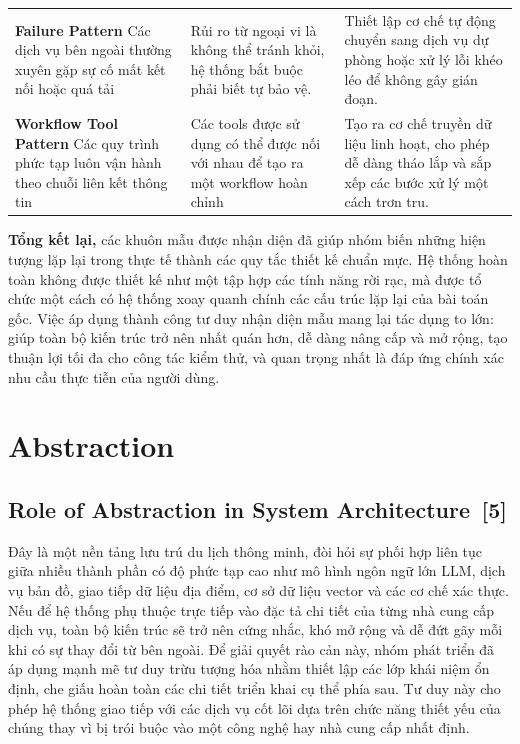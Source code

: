 \documentclass[12pt, a4paper]{article}
\begin{document}
{\begin{xltabular}{\textwidth}{@{} >{\raggedright\arraybackslash{}\hsize}X >{\raggedright\arraybackslash{}\hsize}X >{\raggedright\arraybackslash{}\hsize}X @{}}
    \addlinespace
    \textbf{Failure Pattern} \newline Các dịch vụ bên ngoài thường xuyên gặp sự cố mất kết nối hoặc quá tải & Rủi ro từ ngoại vi là không thể tránh khỏi, hệ thống bắt buộc phải biết tự bảo vệ. & Thiết lập cơ chế tự động chuyển sang dịch vụ dự phòng hoặc xử lý lỗi khéo léo để không gây gián đoạn. \\
    \addlinespace
    \textbf{Workflow Tool Pattern} \newline Các quy trình phức tạp luôn vận hành theo chuỗi liên kết thông tin & Các tools được sử dụng có thể được nối với nhau để tạo ra một workflow hoàn chỉnh & Tạo ra cơ chế truyền dữ liệu linh hoạt, cho phép dễ dàng tháo lắp và sắp xếp các bước xử lý một cách trơn tru. \\
\end{xltabular}}

\vspace{0.3cm}
\noindent \textbf{Tổng kết lại,} các khuôn mẫu được nhận diện đã giúp nhóm biến những hiện tượng lặp lại trong thực tế thành các quy tắc thiết kế chuẩn mực. Hệ thống hoàn toàn không được thiết kế như một tập hợp các tính năng rời rạc, mà được tổ chức một cách có hệ thống xoay quanh chính các cấu trúc lặp lại của bài toán gốc. Việc áp dụng thành công tư duy nhận diện mẫu mang lại tác dụng to lớn: giúp toàn bộ kiến trúc trở nên nhất quán hơn, dễ dàng nâng cấp và mở rộng, tạo thuận lợi tối đa cho công tác kiểm thử, và quan trọng nhất là đáp ứng chính xác nhu cầu thực tiễn của người dùng.

\newpage
\section{Abstraction}

\subsection[Role of Abstraction in System Architecture]{Role of Abstraction in System Architecture \,{\normalfont\small\textcolor{cyan!70!black}{[5]}}}

Đây là một nền tảng lưu trú du lịch thông minh, đòi hỏi sự phối hợp liên tục giữa nhiều thành phần có độ phức tạp cao như mô hình ngôn ngữ lớn LLM, dịch vụ bản đồ, giao tiếp dữ liệu địa điểm, cơ sở dữ liệu vector và các cơ chế xác thực. Nếu để hệ thống phụ thuộc trực tiếp vào đặc tả chi tiết của từng nhà cung cấp dịch vụ, toàn bộ kiến trúc sẽ trở nên cứng nhắc, khó mở rộng và dễ đứt gãy mỗi khi có sự thay đổi từ bên ngoài. Để giải quyết rào cản này, nhóm phát triển đã áp dụng mạnh mẽ tư duy trừu tượng hóa nhằm thiết lập các lớp khái niệm ổn định, che giấu hoàn toàn các chi tiết triển khai cụ thể phía sau. Tư duy này cho phép hệ thống giao tiếp với các dịch vụ cốt lõi dựa trên chức năng thiết yếu của chúng thay vì bị trói buộc vào một công nghệ hay nhà cung cấp nhất định.
\end{document}
